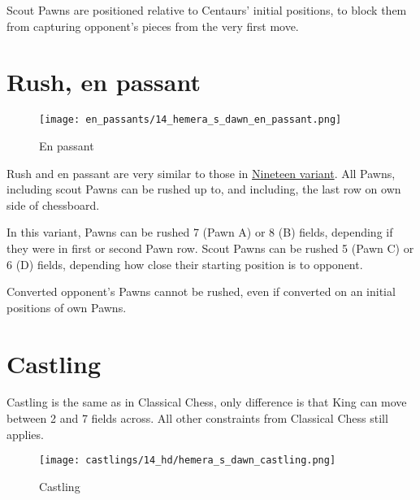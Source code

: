 Scout Pawns are positioned relative to Centaurs' initial positions, to block them from capturing opponent's
pieces from the very first move.

\clearpage %

\section*{Rush, en passant}

\vspace*{-1.2\baselineskip}
\noindent
\begin{figure}[!h]
\texttt{[image: en\_passants/14\_hemera\_s\_dawn\_en\_passant.png]}
\caption{En passant}
\label{fig:14_hemera_s_dawn_en_passant}
\end{figure}

Rush and en passant are very similar to those in \hyperref[fig:12_nineteen_en_passant]{Nineteen variant}.
All Pawns, including scout Pawns can be rushed up to, and including, the last row on own side of
chessboard.

In this variant, Pawns can be rushed 7 (Pawn A) or 8 (B) fields, depending if they were in first or second
Pawn row. Scout Pawns can be rushed 5 (Pawn C) or 6 (D) fields, depending how close their starting position
is to opponent.

Converted opponent's Pawns cannot be rushed, even if converted on an initial positions
of own Pawns.

\clearpage %

\section*{Castling}

Castling is the same as in Classical Chess, only difference is that King can move between 2 and 7 fields across.
All other constraints from Classical Chess still applies.

\noindent
\begin{figure}[!h]
\texttt{[image: castlings/14\_hd/hemera\_s\_dawn\_castling.png]}
\caption{Castling}
\label{fig:hemera_s_dawn_castling}
\end{figure}

